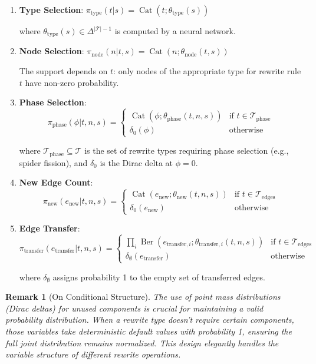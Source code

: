 \documentclass[11pt,a4paper]{article}
\newtheorem{remark}{Remark}
\DeclareMathOperator{\Cat}{Cat}
\DeclareMathOperator{\Ber}{Ber}
\newcommand{\cT}{\mathcal{T}}
\begin{document}
\begin{enumerate}
    \item \textbf{Type Selection}: $\pi_{\text{type}}(t|s) = \Cat(t; \theta_{\text{type}}(s))$

    where $\theta_{\text{type}}(s) \in \Delta^{|\cT|-1}$ is computed by a neural network.

    \item \textbf{Node Selection}: $\pi_{\text{node}}(n|t,s) = \Cat(n; \theta_{\text{node}}(t,s))$

    The support depends on $t$: only nodes of the appropriate type for rewrite rule $t$ have non-zero probability.

    \item \textbf{Phase Selection}:
    \[
    \pi_{\text{phase}}(\phi|t,n,s) = \begin{cases}
    \Cat(\phi; \theta_{\text{phase}}(t,n,s)) & \text{if } t \in \cT_{\text{phase}} \\
    \delta_0(\phi) & \text{otherwise}
    \end{cases}
    \]

    where $\cT_{\text{phase}} \subseteq \cT$ is the set of rewrite types requiring phase selection (e.g., spider fission), and $\delta_0$ is the Dirac delta at $\phi = 0$.

    \item \textbf{New Edge Count}:
    \[
    \pi_{\text{new}}(e_{\text{new}}|t,n,s) = \begin{cases}
    \Cat(e_{\text{new}}; \theta_{\text{new}}(t,n,s)) & \text{if } t \in \cT_{\text{edges}} \\
    \delta_0(e_{\text{new}}) & \text{otherwise}
    \end{cases}
    \]

    \item \textbf{Edge Transfer}:
    \[
    \pi_{\text{transfer}}(e_{\text{transfer}}|t,n,s) = \begin{cases}
    \prod_{i} \Ber(e_{\text{transfer},i}; \theta_{\text{transfer},i}(t,n,s)) & \text{if } t \in \cT_{\text{edges}} \\
    \delta_{\emptyset}(e_{\text{transfer}}) & \text{otherwise}
    \end{cases}
    \]

    where $\delta_{\emptyset}$ assigns probability 1 to the empty set of transferred edges.
\end{enumerate}

\begin{remark}[On Conditional Structure]
The use of point mass distributions (Dirac deltas) for unused components is crucial for maintaining a valid probability distribution. When a rewrite type doesn't require certain components, those variables take deterministic default values with probability 1, ensuring the full joint distribution remains normalized. This design elegantly handles the variable structure of different rewrite operations.
\end{remark}
\end{document}
